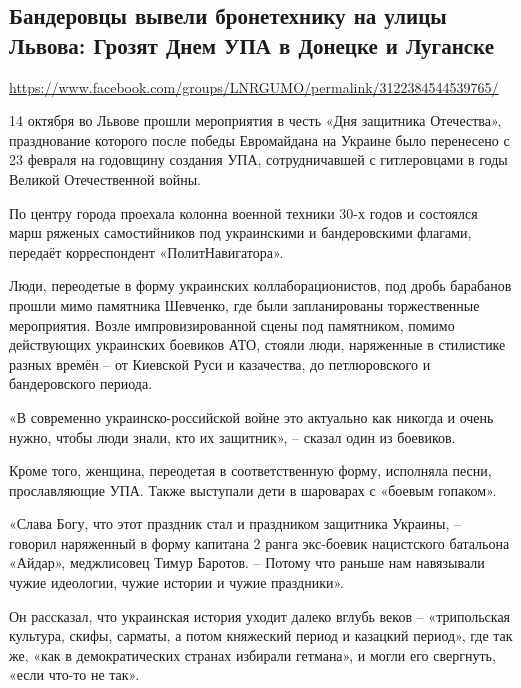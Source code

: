  
 

\subsection{Бандеровцы вывели бронетехнику на улицы Львова: Грозят Днем УПА в Донецке и Луганске }

\url{https://www.facebook.com/groups/LNRGUMO/permalink/3122384544539765/}

14 октября во Львове прошли мероприятия в честь «Дня защитника Отечества»,
празднование которого после победы Евромайдана на Украине было перенесено с 23
февраля на годовщину создания УПА, сотрудничавшей с гитлеровцами в годы Великой
Отечественной войны.

По центру города проехала колонна военной техники 30-х годов и состоялся марш
ряженых самостийников под украинскими и бандеровскими флагами, передаёт
корреспондент «ПолитНавигатора».  

Люди, переодетые в форму украинских
коллаборационистов, под дробь барабанов прошли мимо памятника Шевченко, где
были запланированы торжественные мероприятия. Возле импровизированной сцены под
памятником, помимо действующих украинских боевиков АТО, стояли люди, наряженные
в стилистике разных времён – от Киевской Руси и казачества, до петлюровского и
бандеровского периода.

«В современно украинско-российской войне это актуально как никогда и очень
нужно, чтобы люди знали, кто их защитник», – сказал один из боевиков.

Кроме того, женщина, переодетая в соответственную форму, исполняла песни,
прославляющие УПА. Также выступали дети в шароварах с «боевым гопаком».

«Слава Богу, что этот праздник стал и праздником защитника Украины, – говорил
наряженный в форму капитана 2 ранга экс-боевик нацистского батальона «Айдар»,
меджлисовец Тимур Баротов. – Потому что раньше нам навязывали чужие идеологии,
чужие истории и чужие праздники».

Он рассказал, что украинская история уходит далеко вглубь веков – «трипольская
культура, скифы, сарматы, а потом княжеский период и казацкий период», где так
же, «как в демократических странах избирали гетмана», и могли его свергнуть,
«если что-то не так».

